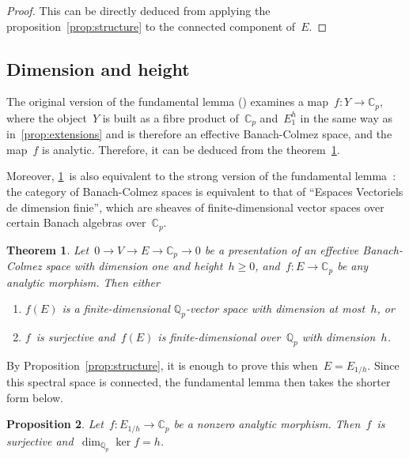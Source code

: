 \documentclass{article}
\newtheorem{thm}{Theorem}[subsection]
\newtheorem{prop}[thm]{Proposition}
\theoremstyle{definition}
\def\Cp{{ℂ_p}}
\begin{document}
\begin{proof}
This can be directly deduced from applying the
proposition~\ref{prop:structure} to the connected component of~$E$.
\end{proof}%


\subsection{Dimension and height}

The original version of the fundamental lemma (\cite[2.1]{CF2000}) examines a
map~$f: Y → \Cp$, where the object~$Y$ is built as a fibre product
of~$\Cp$ and~$E_1^h$ in the same way as in~\ref{prop:extensions} and is
therefore an effective Banach-Colmez space, and the map~$f$ is analytic.
Therefore, it can be deduced from the theorem~\ref{prop:LF}.

Moreover, \ref{prop:LF}~is also equivalent to the strong version of the
fundamental lemma~\cite[6.11]{Colmez2002EBDF}: the category of Banach-Colmez
spaces is equivalent to that of ``Espaces Vectoriels de dimension
finie'', which are sheaves of finite-dimensional vector spaces over
certain Banach algebras over~$\Cp$.

\begin{thm}\label{prop:LF}
Let~$0 → V → E → \Cp → 0$ be a presentation of an effective Banach-Colmez
space with dimension one and height~$h ≥ 0$, and~$f: E → \Cp$ be any
analytic morphism. Then either
\begin{enumerate}
\item $f(E)$ is a finite-dimensional $ℚ_p$-vector space with dimension at
most~$h$, or
\item $f$~is surjective and~$f(E)$ is finite-dimensional over~$ℚ_p$ with
dimension~$h$.
\end{enumerate}
\end{thm}%

By Proposition~\ref{prop:structure}, it is enough to prove this
when~$E = E_{1/h}$. Since this spectral space is connected, the
fundamental lemma then takes the shorter form below.

\begin{prop}\label{prop:LF-E1h}
Let~$f: E_{1/h} → \Cp$ be a nonzero analytic morphism. Then~$f$~is
surjective and~$\dim_{ℚ_p} \ker f = h$.
\end{prop}%
\end{document}

